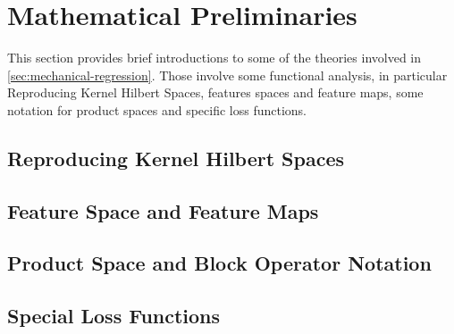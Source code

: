 \section{Mathematical Preliminaries}

This section provides brief introductions to some of the theories involved in \cref{sec:mechanical-regression}.
Those involve some functional analysis, in particular Reproducing Kernel Hilbert Spaces, features spaces and feature maps, some notation for product spaces and specific loss functions.

\subsection{Reproducing Kernel Hilbert Spaces}



\subsection{Feature Space and Feature Maps}



\subsection{Product Space and Block Operator Notation}
\label{sec:block-operator-notation}



\subsection{Special Loss Functions}


%
